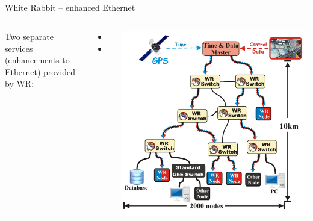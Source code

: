 \documentclass[compress,red]{beamer}
\begin{document}
\subsection{}
\begin{frame}{White Rabbit -- enhanced Ethernet}


\begin{columns}[c]
 
  Two separate services (enhancements to Ethernet) provided by WR: 
  \begin{itemize}
    \item \color{blue!90}{Synchronization: \\
accuracy better than 1 ns \\
precision  (tens of ps sdev skew max)}
    \item \color{red}{Deterministic, reliable and low-latency Control Data delivery}
  \end{itemize}

    \begin{center}
    \includegraphics[width=1.0\textwidth]{network/wr_network-enhanced_pro.pdf}
    \end{center}
\end{columns}

\end{frame}
\end{document}
